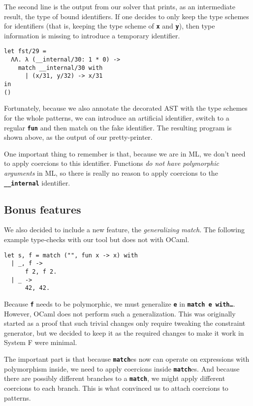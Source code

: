 \documentclass[10pt,a4paper,twoside,titlepage,twocolumn]{article}
\newcommand{\code}[1]{\textbf{\texttt{#1}}}
\begin{document}
The second line is the output from our solver that prints, as an intermediate
result, the type of bound identifiers. If one decides to only keep the type
schemes for identifiers (that is, keeping the type scheme of \code{x} and
\code{y}), then type information is missing to introduce a temporary identifier.

\begin{verbatim}
let fst/29 =
  ΛΛ. λ (__internal/30: 1 * 0) -> 
    match __internal/30 with
      | (x/31, y/32) -> x/31
in
()
\end{verbatim}

Fortunately, because we also annotate the decorated AST with the type schemes
for the whole patterns, we can introduce an artificial identifier, switch to a
regular \code{fun} and then match on the fake identifier. The resulting program
is shown above, as the output of our pretty-printer.

One important thing to remember is that, because we are in ML, we don't need to
apply coercions to this identifier. Functions \emph{do not have polymorphic
arguments} in ML, so there is really no reason to apply coercions to the
\code{\_\_internal} identifier.

\subsection{Bonus features}

We also decided to include a new feature, the \emph{generalizing match}. The
following example type-checks with our tool but does not with OCaml.

\begin{verbatim}
let s, f = match ("", fun x -> x) with
  | _, f ->
      f 2, f 2.
  | _ ->
      42, 42.
\end{verbatim}

Because \code{f} needs to be polymorphic, we must generalize \code{e} in
\code{match e with\dots}. However, OCaml does not perform such a generalization.
This was originally started as a proof that such trivial changes only require
tweaking the constraint generator, but we decided to keep it as the required
changes to make it work in System F were minimal.

The important part is that because \code{match}es now can operate on
expressions with polymorphism inside, we need to apply coercions inside
\code{match}es. And because there are possibly different branches to a
\code{match}, we might apply different coercions to each branch. This is what
convinced us to attach coercions to patterns.
\end{document}
